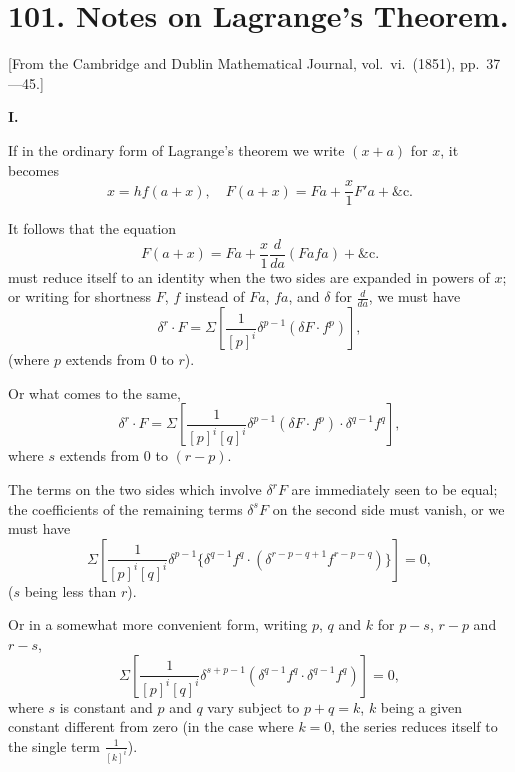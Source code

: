 \documentclass[11pt,a4paper]{book}
\begin{document}
\section*{101. Notes on Lagrange's Theorem.}

[From the Cambridge and Dublin Mathematical Journal, vol.\ vi.\ (1851), pp.\ 37---45.]

\bigskip
\noindent\textbf{I.}

If in the ordinary form of Lagrange's theorem we write $(x+a)$ for $x$, it becomes
\begin{equation}
x = hf(a+x), \quad F(a+x) = Fa + \frac{x}{1}F'a + \&\text{c.}
\tag{1}
\end{equation}

It follows that the equation
\begin{equation}
F(a+x) = Fa + \frac{x}{1}\frac{d}{da}(Fafa) + \&\text{c.}
\tag{2}
\end{equation}
must reduce itself to an identity when the two sides are expanded in powers of $x$;
or writing for shortness $F$, $f$ instead of $Fa$, $fa$, and $\delta$ for $\frac{d}{da}$, we must have
\begin{equation}
\delta^r \cdot F = \Sigma \left[ \frac{1}{[p]^i} \delta^{p-1} (\delta F \cdot f^p) \right],
\tag{3}
\end{equation}
(where $p$ extends from $0$ to $r$).

Or what comes to the same,
\begin{equation}
\delta^r \cdot F = \Sigma \left[ \frac{1}{[p]^i [q]^i} \delta^{p-1} (\delta F \cdot f^p) \cdot \delta^{q-1} f^q \right],
\tag{4}
\end{equation}
where $s$ extends from $0$ to $(r-p)$.

The terms on the two sides which involve $\delta^r F$ are immediately seen to be equal; the coefficients of the remaining terms $\delta^s F$ on the second side must vanish, or we must have
\begin{equation}
\Sigma \left[ \frac{1}{[p]^i [q]^i} \delta^{p-1} \{ \delta^{q-1} f^q \cdot (\delta^{r-p-q+1} f^{r-p-q}) \} \right] = 0,
\tag{5}
\end{equation}
($s$ being less than $r$).

Or in a somewhat more convenient form, writing $p$, $q$ and $k$ for $p-s$, $r-p$ and $r-s$,
\begin{equation}
\Sigma \left[ \frac{1}{[p]^i [q]^i} \delta^{s+p-1} (\delta^{q-1} f^q \cdot \delta^{q-1} f^q) \right] = 0,
\tag{6}
\end{equation}
where $s$ is constant and $p$ and $q$ vary subject to $p+q=k$, $k$ being a given constant different from zero (in the case where $k=0$, the series reduces itself to the single term $\frac{1}{[k]^i}$).
\end{document}
